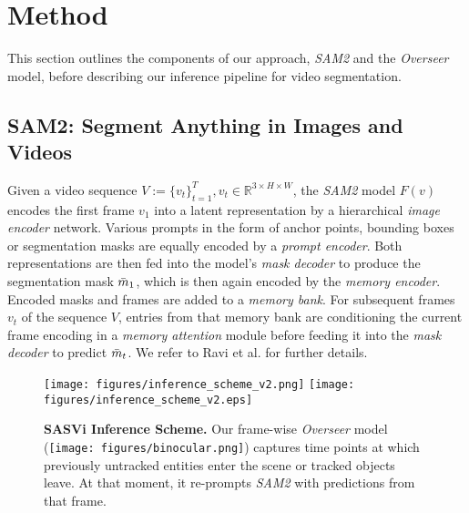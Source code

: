 \section{Method}
\label{sec:meth}

This section outlines the components of our approach, \emph{SAM2} and the \emph{Overseer} model, before describing our inference pipeline for video segmentation.

\subsection{SAM2: Segment Anything in Images and Videos}
Given a video sequence $V := \{v_t\}_{t=1}^{T}, v_t \in \mathbb{R}^{3 \times H \times W}$, the \emph{SAM2} model $F(v)$ encodes the first frame $v_1$ into a latent representation by a hierarchical \emph{image encoder} network. Various prompts in the form of anchor points, bounding boxes or segmentation masks are equally encoded by a \emph{prompt encoder}. Both representations are then fed into the model's \emph{mask decoder} to produce the segmentation mask $\Bar{m}_1$, which is then again encoded by the \emph{memory encoder}. Encoded masks and frames are added to a \emph{memory bank}. For subsequent frames $v_t$ of the sequence $V$, entries from that memory bank are conditioning the current frame encoding in a \emph{memory attention} module before feeding it into the \emph{mask decoder} to predict $\Bar{m}_t$. We refer to Ravi et al. \cite{ravi2024sam} for further details.

\begin{figure}[htbp]
    \centering
    \if{}
        \texttt{[image: figures/inference\_scheme\_v2.png]}
    \else
        \texttt{[image: figures/inference\_scheme\_v2.eps]}
    \fi
    \caption{\textbf{SASVi Inference Scheme.} Our frame-wise \emph{Overseer} model (\texttt{[image: figures/binocular.png]}) captures time points at which previously untracked entities enter the scene or tracked objects leave. At that moment, it re-prompts \emph{SAM2} with predictions from that frame.}
    \label{fig:sasvi}
\end{figure}

